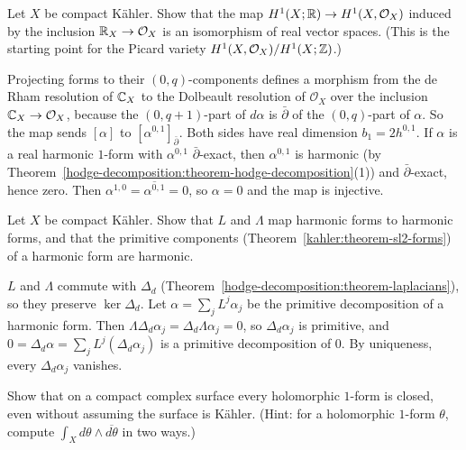 \begin{exercise}\label{hodge-decomposition:exercise-h1-real}
Let $X$ be compact K\"ahler. Show that the map $H^1(X; \mathbb{R}) \to H^1(X, \mathcal{O}_X)$ induced by the inclusion $\mathbb{R}_X \to \mathcal{O}_X$ is an
isomorphism of real vector spaces. (This is the starting point for the Picard variety $H^1(X, \mathcal{O}_X)/H^1(X; \mathbb{Z})$.)
\end{exercise}

\begin{solution}
Projecting forms to their $(0,q)$-components defines a morphism from the de Rham resolution of $\mathbb{C}_X$ to the Dolbeault resolution of
$\mathcal{O}_X$ over the inclusion $\mathbb{C}_X \to \mathcal{O}_X$, because the $(0, q+1)$-part of $d\alpha$ is $\bar\partial$ of the
$(0,q)$-part of $\alpha$. So the map sends $[\alpha]$ to $[\alpha^{0,1}]_{\bar\partial}$. Both sides have real dimension $b_1 = 2h^{0,1}$.
If $\alpha$ is a real harmonic $1$-form with $\alpha^{0,1}$ $\bar\partial$-exact, then $\alpha^{0,1}$ is harmonic (by
Theorem~\ref{hodge-decomposition:theorem-hodge-decomposition}(1)) and $\bar\partial$-exact, hence zero. Then $\alpha^{1,0} = \overline{\alpha^{0,1}} = 0$,
so $\alpha = 0$ and the map is injective.
\end{solution}

\begin{exercise}\label{hodge-decomposition:exercise-lefschetz-harmonic}
Let $X$ be compact K\"ahler. Show that $L$ and $\Lambda$ map harmonic forms to harmonic forms, and that the primitive components
(Theorem~\ref{kahler:theorem-sl2-forms}) of a harmonic form are harmonic.
\end{exercise}

\begin{solution}
$L$ and $\Lambda$ commute with $\Delta_d$ (Theorem~\ref{hodge-decomposition:theorem-laplacians}), so they preserve $\ker\Delta_d$. Let
$\alpha = \sum_jL^j\alpha_j$ be the primitive decomposition of a harmonic form. Then $\Lambda\Delta_d\alpha_j = \Delta_d\Lambda\alpha_j = 0$,
so $\Delta_d\alpha_j$ is primitive, and $0 = \Delta_d\alpha = \sum_jL^j(\Delta_d\alpha_j)$ is a primitive decomposition of $0$. By
uniqueness, every $\Delta_d\alpha_j$ vanishes.
\end{solution}

\begin{exercise}\label{hodge-decomposition:exercise-holomorphic-closed-surface}
Show that on a compact complex surface every holomorphic $1$-form is closed, even without assuming the surface is K\"ahler.
(Hint: for a holomorphic $1$-form $\theta$, compute $\int_Xd\theta \wedge \overline{d\theta}$ in two ways.)
\end{exercise}

